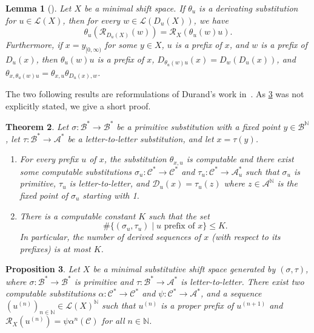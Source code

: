 \documentclass{amsart}
\newcommand*{\N}{\mathbb{N}}
\newcommand*{\nn}{\mathbb{N}}
\newcommand*{\ret}{\mathcal{R}}
\newcommand*{\lang}{\mathcal{L}}
\newcommand*{\cA}{\mathcal{A}}
\newcommand*{\cB}{\mathcal{B}}
\newcommand*{\cC}{\mathcal{C}}
\newcommand*{\from}{\colon}
\newcommand*{\card}{\#}
\theoremstyle{plain}
\newtheorem{theorem}{Theorem}
\newtheorem{proposition}[theorem]{Proposition}
\newtheorem{lemma}[theorem]{Lemma}
\theoremstyle{definition}
\theoremstyle{remark}
\begin{document}
\begin{lemma}[{\cite[Proposition 2.6]{Durand1998}}]
\label{l:durand derivation en chaine}
    Let $X$ be a minimal shift space. If $\theta_u$ is a derivating substitution for $u \in \lang(X)$, then for every $w \in \lang(D_u(X))$, we have
    \[
        \theta_u(\ret_{D_u(X)}(w)) = \ret_X(\theta_u(w)u).
    \]
    Furthermore, if $x = y_{[0,\infty)}$ for some $y \in X$, $u$ is a prefix of $x$, and $w$ is a prefix of $D_u(x)$, then $\theta_u(w)u$ is a prefix of $x$, $D_{\theta_u(w)u}(x) = D_w(D_u(x))$, and $\theta_{x,\theta_u(w)u} = \theta_{x,u}\theta_{D_u(x),w}$.
\end{lemma}

The two following results are reformulations of Durand's work in~\cite{Durand1998,Durand2012}. As \cref{prop:durand} was not explicitly stated, we give a short proof.

\begin{theorem}\label{thm:durand_caclculable}
    Let $\sigma\from \cB^* \to \cB^*$ be a primitive substitution with a fixed point $y\in \cB^{\N}$, let $\tau\from \cB^* \to \cA^*$ be a letter-to-letter substitution, and let $x = \tau(y)$. 
    \begin{enumerate}
        \item For every prefix $u$ of $x$, the substitution $\theta_{x,u}$ is computable and there exist some computable substitutions $\sigma_{u}\from \cC^* \to \cC^*$ and $\tau_u\from \cC^* \to \cA_u^*$ such that $\sigma_u$ is primitive, $\tau_u$ is letter-to-letter, and $\mathcal{D}_u(x) = \tau_{u}(z)$ where $z\in\cA^\nn$ is the fixed point of $\sigma_u$ starting with 1.
        \item There is a computable constant $K$ such that the set 
            \begin{equation*}
                \card\{(\sigma_{u},\tau_{u}) \mid u \text{ prefix of } x\} \leq K.
            \end{equation*}
        In particular, the number of derived sequences of $x$ (with respect to its prefixes) is at most $K$. 
    \end{enumerate}
\end{theorem}

\begin{proposition}\label{prop:durand}
    Let $X$ be a minimal substitutive shift space generated by $(\sigma,\tau)$, where $\sigma\from \cB^* \to \cB^*$ is primitive and $\tau\from \cB^* \to \cA^*$ is letter-to-letter. There exist two computable substitutions $\alpha\from \cC^* \to \cC^*$ and $\psi\from \cC^* \to \cA^*$, and a sequence $(u^{(n)})_{n \in \nn} \in \lang(X)^\nn$ such that $u^{(n)}$ is a proper prefix of $u^{(n+1)}$ and $\ret_X(u^{(n)}) = \psi \alpha^n(\cC)$ for all $n \in\nn$.
\end{proposition}
\end{document}
